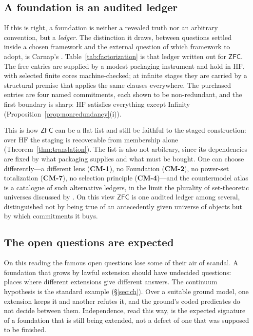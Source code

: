\documentclass[11pt]{article}
\newcommand{\HF}{\mathrm{HF}}                 \newcommand{\rank}{\operatorname{rank}}
\theoremstyle{definition}
\begin{document}
\subsection{A foundation is an audited ledger}

If this is right, a foundation is neither a revealed truth nor an arbitrary convention, but a
\emph{ledger}. The distinction it draws, between questions settled inside a chosen framework and
the external question of which framework to adopt, is Carnap's \citep{Carnap1950}.
Table~\ref{tab:factorization} is that ledger written out for $\mathsf{ZFC}$. The free entries are
supplied by a modest packaging instrument and hold in $\HF$, with selected finite cores
machine-checked; at infinite stages they are carried by a structural premise that applies the same
clauses everywhere. The purchased entries are four named commitments, each shown to be
non-redundant, and the first boundary is sharp: $\HF$ satisfies everything except Infinity
(Proposition~\ref{prop:nonredundancy}(i)).

This is how $\mathsf{ZFC}$ can be a flat list and still be faithful to the staged construction:
over $\HF$ the staging is recoverable from membership alone (Theorem~\ref{thm:translation}). The
list is also not arbitrary, since its dependencies are fixed by what packaging supplies and what
must be bought. One can choose differently---a different lens (\textbf{CM-1}), no Foundation
(\textbf{CM-2}), no power-set totalization (\textbf{CM-7}), no selection principle
(\textbf{CM-4})---and the countermodel atlas is a catalogue of such alternative ledgers, in the
limit the plurality of set-theoretic universes discussed by \citet{Hamkins2012}. On this view
$\mathsf{ZFC}$ is one audited ledger among several, distinguished not by being true of an
antecedently given universe of objects \citep{Benacerraf1965} but by which commitments it buys.

\subsection{The open questions are expected}

On this reading the famous open questions lose some of their air of scandal. A foundation that
grows by lawful extension should have undecided questions: places where different extensions give
different answers. The continuum hypothesis is the standard example (\S\ref{sec:ch}). Over a
suitable ground model, one extension keeps it and another refutes it, and the ground's coded
predicates do not decide between them. Independence, read this way, is the expected signature of a
foundation that is still being extended, not a defect of one that was supposed to be finished.
\end{document}
